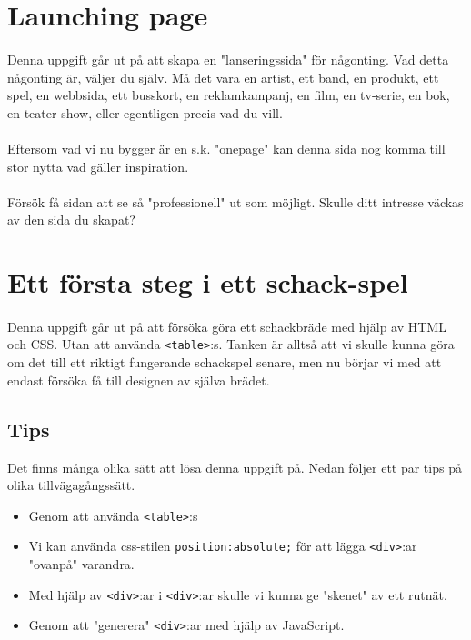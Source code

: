 \documentclass{article}
\begin{document}
  \newpage
  \section{ Launching page }
    \paragraph{}
    Denna uppgift går ut på att skapa en "lanseringssida" för någonting. Vad detta någonting är, väljer du själv. Må det vara en artist, ett band, en produkt, ett spel, en webbsida, ett busskort, en reklamkampanj, en film, en tv-serie, en bok, en teater-show, eller egentligen precis vad du vill.

    \paragraph{}
    Eftersom vad vi nu bygger är en s.k. "onepage" kan \href{http://onepagelove.com/}{denna sida} nog komma till stor nytta vad gäller inspiration.

    \paragraph{}
    Försök få sidan att se så "professionell" ut som möjligt. Skulle ditt intresse väckas av den sida du skapat?




  \newpage
  \section{ Ett första steg i ett schack-spel }
    \paragraph{}
    Denna uppgift går ut på att försöka göra ett schackbräde med hjälp av HTML och CSS. Utan att använda \texttt{<table>}:s. Tanken är alltså att vi skulle kunna göra om det till ett riktigt fungerande schackspel senare, men nu börjar vi med att endast försöka få till designen av själva brädet.

    \subsection*{Tips}
      Det finns många olika sätt att lösa denna uppgift på. Nedan följer ett par tips på olika tillvägagångssätt.
      \begin{itemize}
        \item Genom att använda \texttt{<table>}:s
        \item Vi kan använda css-stilen \texttt{position:absolute;} för att lägga \texttt{<div>}:ar "ovanpå" varandra.
        \item Med hjälp av \texttt{<div>}:ar i \texttt{<div>}:ar skulle vi kunna ge "skenet" av ett rutnät.
        \item Genom att "generera" \texttt{<div>}:ar med hjälp av JavaScript.
      \end{itemize}
\end{document}

